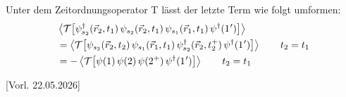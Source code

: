 Unter dem Zeitordnungsoperator T lässt der letzte Term wie folgt umformen:
\begin{align}
   & \left\langle\mathcal T\!\left[\psi_{s_2}^\dagger(\vec r_2,t_1)\,\psi_{s_2}(\vec r_2,t_1)\,\psi_{s_1}(\vec r_1,t_1)\,\psi^\dagger(1\mkern1mu')\right]\right\rangle\notag                     \\
   & = \left\langle\mathcal T\!\left[\psi_{s_2}(\vec r_2,t_2)\,\psi_{s_1}(\vec r_1,t_1)\,\psi_{s_2}^\dagger(\vec r_2,t_2^+)\,\psi^\dagger(1\mkern1mu')\right]\right\rangle \qquad t_2=t_1 \notag \\
   & = - \left\langle\mathcal T\!\left[\psi(1)\,\psi(2)\,\psi(2^+)\,\psi^\dagger(1\mkern1mu')\right]\right\rangle \qquad t_2=t_1
\end{align}

[Vorl. 22.05.2026]